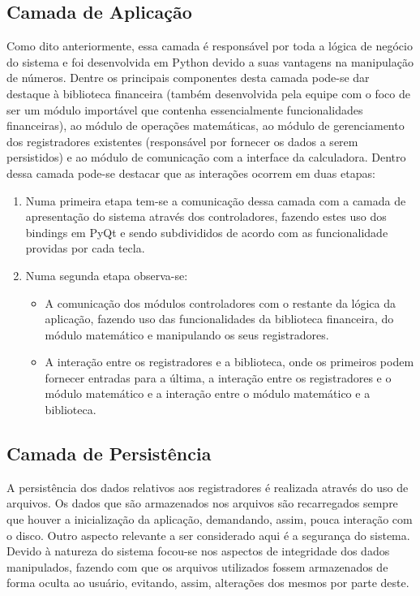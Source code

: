 \subsection{Camada de Aplicação}
Como dito anteriormente, essa camada é responsável por toda a lógica de negócio do sistema e foi desenvolvida em Python devido a suas vantagens na manipulação de números.
Dentre os principais componentes desta camada pode-se dar destaque à biblioteca financeira (também desenvolvida pela equipe com o foco de ser um módulo importável que contenha essencialmente funcionalidades financeiras), ao módulo de operações matemáticas, ao módulo de gerenciamento dos registradores existentes (responsável por fornecer os dados a serem persistidos) e ao módulo de comunicação com a interface da calculadora.
 Dentro dessa camada pode-se destacar que as interações ocorrem em duas etapas:
\begin{enumerate}
 \item Numa primeira etapa tem-se a comunicação dessa camada com a camada de apresentação do sistema através dos controladores, fazendo estes uso dos bindings em PyQt e sendo subdivididos de acordo com as funcionalidade providas por cada tecla.
 \item Numa segunda etapa observa-se:	
 \begin{itemize}
    \item A comunicação dos módulos controladores com o restante da lógica da aplicação, fazendo uso das funcionalidades da biblioteca financeira, do módulo matemático e manipulando os seus registradores.
    \item A interação entre os registradores e a biblioteca, onde os primeiros podem fornecer entradas para a última, a interação entre os registradores e o módulo matemático e a interação entre o módulo matemático e a biblioteca.
 \end{itemize}
\end{enumerate}

\subsection{Camada de Persistência}
A persistência dos dados relativos aos registradores é realizada através do uso de arquivos. Os dados que são armazenados nos arquivos são recarregados sempre que houver a inicialização da aplicação, demandando, assim, pouca interação com o disco.
Outro aspecto relevante a ser considerado aqui é a segurança do sistema.  Devido à natureza do sistema focou-se nos aspectos de integridade dos dados manipulados, fazendo com que os arquivos utilizados fossem armazenados de forma oculta ao usuário, evitando, assim, alterações dos mesmos por parte deste.

